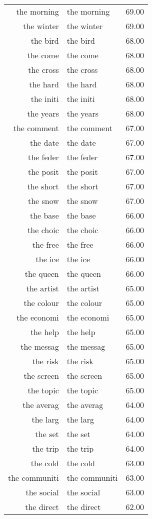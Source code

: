 \begin{table}[ht]
\begin{tabular}{rlr}
  the morning & the morning & 69.00 \\ 
  the winter & the winter & 69.00 \\ 
  the bird & the bird & 68.00 \\ 
  the come & the come & 68.00 \\ 
  the cross & the cross & 68.00 \\ 
  the hard & the hard & 68.00 \\ 
  the initi & the initi & 68.00 \\ 
  the years & the years & 68.00 \\ 
  the comment & the comment & 67.00 \\ 
  the date & the date & 67.00 \\ 
  the feder & the feder & 67.00 \\ 
  the posit & the posit & 67.00 \\ 
  the short & the short & 67.00 \\ 
  the snow & the snow & 67.00 \\ 
  the base & the base & 66.00 \\ 
  the choic & the choic & 66.00 \\ 
  the free & the free & 66.00 \\ 
  the ice & the ice & 66.00 \\ 
  the queen & the queen & 66.00 \\ 
  the artist & the artist & 65.00 \\ 
  the colour & the colour & 65.00 \\ 
  the economi & the economi & 65.00 \\ 
  the help & the help & 65.00 \\ 
  the messag & the messag & 65.00 \\ 
  the risk & the risk & 65.00 \\ 
  the screen & the screen & 65.00 \\ 
  the topic & the topic & 65.00 \\ 
  the averag & the averag & 64.00 \\ 
  the larg & the larg & 64.00 \\ 
  the set & the set & 64.00 \\ 
  the trip & the trip & 64.00 \\ 
  the cold & the cold & 63.00 \\ 
  the communiti & the communiti & 63.00 \\ 
  the social & the social & 63.00 \\ 
  the direct & the direct & 62.00 \\ 

\end{tabular}
\end{table}
